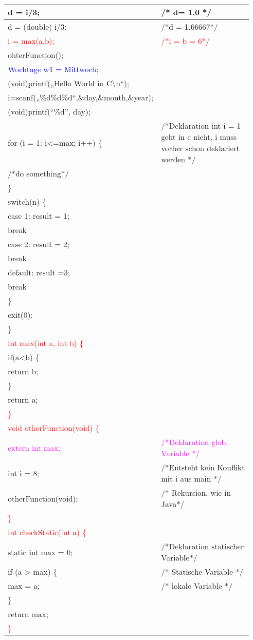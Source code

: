\begin{tabular}{|l|l|}
\hline 
d = i/3;  & /{*} d= 1.0 {*}/\tabularnewline
\hline 
d = (double) i/3;  & /{*}d = 1.66667{*}/\tabularnewline
\hline 
\hline 
\textcolor{red}{i = max(a,b);} & \textcolor{red}{/{*}i = b = 6{*}/}\tabularnewline
\hline 
ohterFunction(); & \tabularnewline
\hline 
\textcolor{blue}{Wochtage w1 = Mittwoch;} & \tabularnewline
\hline 
(void)printf(„Hello World in C\textbackslash{}n“); & \tabularnewline
\hline 
i=scanf(„\%d\%d\%d“,\&day,\&month,\&year); & \tabularnewline
\hline 
(void)printf(“\%d”, day); & \tabularnewline
\hline 
\hline 
for (i = 1; i<=max; i++) \{  & /{*}Deklaration int i = 1 geht in c nicht, i muss vorher schon deklariert
werden {*}/\tabularnewline
\hline 
/{*}do something{*}/ & \tabularnewline
\hline 
\} & \tabularnewline
\hline 
\hline 
switch(n) \{ & \tabularnewline
\hline 
case 1: result = 1; & \tabularnewline
\hline 
break & \tabularnewline
\hline 
case 2: result = 2; & \tabularnewline
\hline 
break & \tabularnewline
\hline 
default: result =3; & \tabularnewline
\hline 
break & \tabularnewline
\hline 
\} & \tabularnewline
\hline 
\hline 
exit(0); & \tabularnewline
\hline 
\} & \tabularnewline
\hline 
\hline 
\textcolor{red}{int max(int a, int b) \{} & \tabularnewline
\hline 
if(a<b) \{ & \tabularnewline
\hline 
return b; & \tabularnewline
\hline 
\} & \tabularnewline
\hline 
return a; & \tabularnewline
\hline 
\textcolor{red}{\}} & \tabularnewline
\hline 
\hline 
\textcolor{red}{void otherFunction(void) \{} & \tabularnewline
\hline 
\textcolor{magenta}{extern int max; } & \textcolor{magenta}{/{*}Deklaration glob. Variable {*}/}\tabularnewline
\hline 
int i = 8;  & /{*}Entsteht kein Konflikt mit i aus main {*}/\tabularnewline
\hline 
otherFunction(void); & /{*} Rekursion, wie in Java{*}/\tabularnewline
\hline 
\textcolor{red}{\}} & \tabularnewline
\hline 
\hline 
\textcolor{red}{int checkStatic(int a) \{} & \tabularnewline
\hline 
static int max = 0;  & /{*}Deklaration statischer Variable{*}/\tabularnewline
\hline 
if (a > max) \{ & /{*} Statische Variable {*}/\tabularnewline
\hline 
max = a; & /{*} lokale Variable {*}/\tabularnewline
\hline 
\} & \tabularnewline
\hline 
return max; & \tabularnewline
\hline 
\textcolor{red}{\}} & \tabularnewline
\hline 
\end{tabular}
